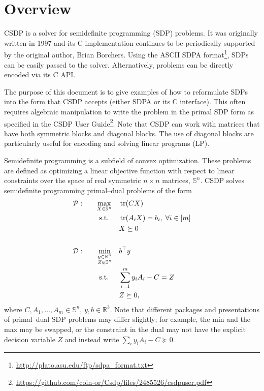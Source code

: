 \documentclass[a4paper]{article}
\begin{document}
\section*{Overview}
CSDP is a solver for semidefinite programming (SDP) problems.
It was originally written in 1997 and its C implementation continues to be periodically supported by the original author, Brian Borchers.
Using the ASCII SDPA format\footnote{\url{http://plato.asu.edu/ftp/sdpa_format.txt}}, SDPs can be easily passed to the solver.
Alternatively, problems can be directly encoded via its C API.

The purpose of this document is to give examples of how to reformulate SDPs into the form that CSDP accepts (either SDPA or its C interface).
This often requires algebraic manipulation to write the problem in the primal SDP form as specified in the CSDP User Guide\footnote{\url{https://github.com/coin-or/Csdp/files/2485526/csdpuser.pdf}}.
Note that CSDP can work with matrices that have both symmetric blocks and diagonal blocks.
The use of diagonal blocks are particularly useful for encoding and solving linear programs (LP).

Semidefinite programming is a subfield of convex optimization.
These problems are defined as optimizing a linear objective function with respect to linear constraints over the space of real symmetric $n\times n$ matrices, $\mathbb{S}^n$.
CSDP solves semidefinite programming primal--dual problems of the form
\begin{equation*}
\begin{aligned}
\mathcal{P}: \quad && \max_{X\in\mathbb{S}^n}                 \quad & \tr(CX) \\
                   && \textrm{s.t. } \quad & \tr(A_iX) = b_i, \;\forall i\in[m] \\
                   &&                     & X \succeq 0 \\ \\
\mathcal{D}: \quad && \min_{\substack{y\in\mathbb{R}^n\\Z\in\mathbb{S}^n}}\quad & b^\top y \\
                   && \textrm{s.t. } \quad & \sum_{i=1}^m y_i A_i - C = Z\\
                   &&                     & Z \succeq 0,
\end{aligned}
\end{equation*}
where $C, A_1,\dots,A_m\in\mathbb{S}^n$, $y,b\in\mathbb{R}^3$.
Note that different packages and presentations of primal--dual SDP problems may differ slightly; for example, the min and the max may be swapped, or the constraint in the dual may not have the explicit decision variable $Z$ and instead write $\sum_i y_i A_i - C\succeq 0$.
\end{document}
